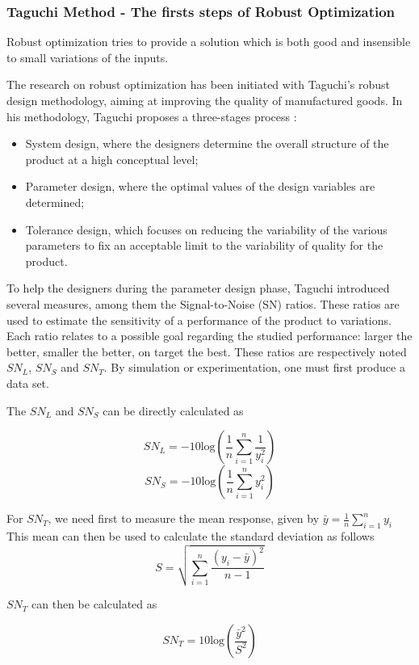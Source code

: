 \subsubsection{Taguchi Method - The firsts steps of Robust Optimization }

Robust optimization tries to provide a solution which is both good and insensible to small variations of the inputs.

The research on robust optimization has been initiated with Taguchi's robust design methodology\cite{tsui1992overview}, aiming at improving the quality of manufactured goods.
In his methodology, Taguchi proposes a three-stages process :
\begin{itemize}
\item System design, where the designers determine the overall structure of the product at a high conceptual level;
\item Parameter design, where the optimal values of the design variables are determined;
\item Tolerance design, which focuses on reducing the variability of the various parameters to fix an acceptable limit to the variability of quality for the product.
\end{itemize}

To help the designers during the parameter design phase, Taguchi introduced several measures, among them the Signal-to-Noise (SN) ratios. These ratios are used to estimate the sensitivity of a performance of the product to variations. Each ratio relates to a possible goal regarding the studied performance: larger the better, smaller the better, on target the best. These ratios are respectively noted $SN_L$, $SN_S$ and $SN_T$.
By simulation or experimentation, one must first produce a data set.

The $SN_L$ and $SN_S$ can be directly calculated as

\[SN_L = -10\text{log}\left( \frac{1}{n} \sum_{i=1}^n \frac{1}{y_i^2} \right)\]
\[SN_S = -10\text{log}\left( \frac{1}{n} \sum_{i=1}^n y_i^2 \right)\]

For $SN_T$, we need first to measure the mean response, given by $\bar{y} = \frac{1}{n}\displaystyle\sum_{i=1}^n y_i$
This mean can then be used to calculate the standard deviation as follows 
\[S = \sqrt{\sum_{i=1}^n \frac{(y_i - \bar{y})^2}{n-1}}\]

 $SN_T$ can then be calculated as
 
 \[ SN_T = 10\text{log}\left(\frac{\bar{y}^2}{S^2}\right) \]
 
